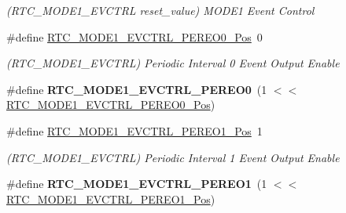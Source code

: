 \begin{DoxyCompactItemize}
\begin{DoxyCompactList}\small\item\em (R\+T\+C\+\_\+\+M\+O\+D\+E1\+\_\+\+E\+V\+C\+T\+R\+L reset\+\_\+value) M\+O\+D\+E1 Event Control \end{DoxyCompactList}\item 
\hypertarget{group___s_a_m_l21___r_t_c_gac51c19f1185092eaa8313ad4fcb4a1b5}{}\#define \hyperlink{group___s_a_m_l21___r_t_c_gac51c19f1185092eaa8313ad4fcb4a1b5}{R\+T\+C\+\_\+\+M\+O\+D\+E1\+\_\+\+E\+V\+C\+T\+R\+L\+\_\+\+P\+E\+R\+E\+O0\+\_\+\+Pos}~0\label{group___s_a_m_l21___r_t_c_gac51c19f1185092eaa8313ad4fcb4a1b5}

\begin{DoxyCompactList}\small\item\em (R\+T\+C\+\_\+\+M\+O\+D\+E1\+\_\+\+E\+V\+C\+T\+R\+L) Periodic Interval 0 Event Output Enable \end{DoxyCompactList}\item 
\hypertarget{group___s_a_m_l21___r_t_c_ga42fd2e55d59c4808c0738a590e8d804d}{}\#define {\bfseries R\+T\+C\+\_\+\+M\+O\+D\+E1\+\_\+\+E\+V\+C\+T\+R\+L\+\_\+\+P\+E\+R\+E\+O0}~(1 $<$$<$ \hyperlink{group___s_a_m_l21___r_t_c_gac51c19f1185092eaa8313ad4fcb4a1b5}{R\+T\+C\+\_\+\+M\+O\+D\+E1\+\_\+\+E\+V\+C\+T\+R\+L\+\_\+\+P\+E\+R\+E\+O0\+\_\+\+Pos})\label{group___s_a_m_l21___r_t_c_ga42fd2e55d59c4808c0738a590e8d804d}

\item 
\hypertarget{group___s_a_m_l21___r_t_c_gab2e6ec0aaf84f8431e011d6300a09526}{}\#define \hyperlink{group___s_a_m_l21___r_t_c_gab2e6ec0aaf84f8431e011d6300a09526}{R\+T\+C\+\_\+\+M\+O\+D\+E1\+\_\+\+E\+V\+C\+T\+R\+L\+\_\+\+P\+E\+R\+E\+O1\+\_\+\+Pos}~1\label{group___s_a_m_l21___r_t_c_gab2e6ec0aaf84f8431e011d6300a09526}

\begin{DoxyCompactList}\small\item\em (R\+T\+C\+\_\+\+M\+O\+D\+E1\+\_\+\+E\+V\+C\+T\+R\+L) Periodic Interval 1 Event Output Enable \end{DoxyCompactList}\item 
\hypertarget{group___s_a_m_l21___r_t_c_ga35e192eb8fbbac9549c175cbc5cae062}{}\#define {\bfseries R\+T\+C\+\_\+\+M\+O\+D\+E1\+\_\+\+E\+V\+C\+T\+R\+L\+\_\+\+P\+E\+R\+E\+O1}~(1 $<$$<$ \hyperlink{group___s_a_m_l21___r_t_c_gab2e6ec0aaf84f8431e011d6300a09526}{R\+T\+C\+\_\+\+M\+O\+D\+E1\+\_\+\+E\+V\+C\+T\+R\+L\+\_\+\+P\+E\+R\+E\+O1\+\_\+\+Pos})\label{group___s_a_m_l21___r_t_c_ga35e192eb8fbbac9549c175cbc5cae062}


\end{DoxyCompactItemize}
